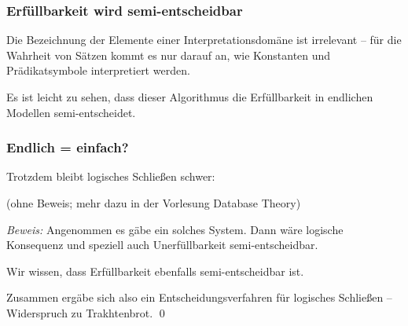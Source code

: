 \documentclass[aspectratio=1610,onlymath]{beamer}
\begin{document}
\begin{frame}\frametitle{Erfüllbarkeit wird semi-entscheidbar}

Die Bezeichnung der Elemente einer Interpretationsdomäne ist irrelevant -- für die Wahrheit von Sätzen kommt es nur darauf an, wie Konstanten und Prädikatsymbole interpretiert werden.\bigskip\pause


Es ist leicht zu sehen, dass dieser Algorithmus die Erfüllbarkeit in endlichen Modellen semi-entscheidet.

\end{frame}

\begin{frame}\frametitle{Endlich = einfach?}\pause

Trotzdem bleibt logisches Schließen schwer:


(ohne Beweis; mehr dazu in der Vorlesung \alert{Database Theory})\pause\bigskip


\emph{Beweis:} Angenommen es gäbe ein solches System.\pause{} Dann wäre logische Konsequenz und speziell auch Unerfüllbarkeit semi-entscheidbar.\bigskip\pause

Wir wissen, dass Erfüllbarkeit ebenfalls semi-entscheidbar ist.\bigskip\pause

Zusammen ergäbe sich also ein Entscheidungsverfahren für logisches Schließen -- Widerspruch zu Trakhtenbrot.
\qed

\end{frame}
\end{document}

